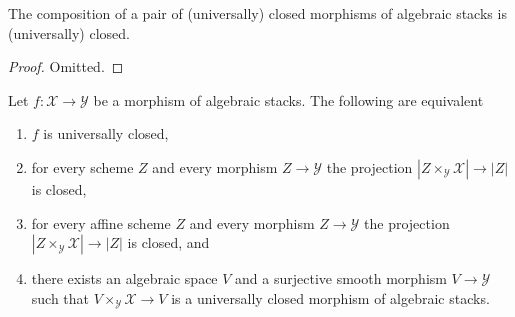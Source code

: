 \begin{lemma}
\label{lemma-composition-universally-closed}
The composition of a pair of (universally) closed morphisms of
algebraic stacks is (universally) closed.
\end{lemma}

\begin{proof}
Omitted.
\end{proof}

\begin{lemma}
\label{lemma-universally-closed-local}
Let $f : \mathcal{X} \to \mathcal{Y}$ be a morphism of algebraic stacks.
The following are equivalent
\begin{enumerate}
\item $f$ is universally closed,
\item for every scheme $Z$ and every morphism $Z \to \mathcal{Y}$
the projection $|Z \times_\mathcal{Y} \mathcal{X}| \to |Z|$
is closed,
\item for every affine scheme $Z$ and every morphism $Z \to \mathcal{Y}$
the projection $|Z \times_\mathcal{Y} \mathcal{X}| \to |Z|$ is
closed, and
\item there exists an algebraic space $V$ and a surjective smooth morphism
$V \to \mathcal{Y}$ such that $V \times_\mathcal{Y} \mathcal{X} \to V$
is a universally closed morphism of algebraic stacks.
\end{enumerate}
\end{lemma}

